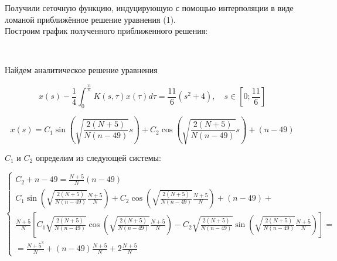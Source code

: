 \documentclass[14pt,a4paper]{scrartcl}
\begin{document}
Получили сеточную функцию, индуцирующую с помощью интерполяции в виде ломаной приближённое решение уравнения (1).\\
Построим график полученного приближенного решения:
\begin{figure}[H]
	\begin{minipage}[h]{1\linewidth}
		  \\
	\end{minipage}
\end{figure}
Найдем аналитическое решение уравнения

\begin{equation*}
x(s)-\frac{1}{4} \int_{0}^{\frac{11}{6}} K(s, \tau) x(\tau) d \tau=\frac{11}{6}\left(s^{2}+4\right), \quad s \in[0 ; \frac{11}{6}]
\end{equation*}

\begin{equation*}
	x(s)=C_{1} \sin (\sqrt{\frac{2(N+5)}{N(n-49)}} s)+C_{2} \cos (\sqrt{\frac{2(N+5)}{N(n-49)}} s)+(n-49)
\end{equation*}

$C_1$ и $C_2$ определим из следующей системы:

\begin{equation*}
	\left\{\begin{array}{l}{C_{2}+n-49=\frac{N+5}{N}(n-49)} \\ {C_{1} \sin \left(\sqrt{\frac{2(N+5)}{N(n-49)}} \frac{N+5}{N}\right)+C_{2} \cos \left(\sqrt{\frac{2(N+5)}{N(n-49)}} \frac{N+5}{N}\right)+(n-49)+} \\ {\frac{N+5}{N}\left[C_{1} \sqrt{\frac{2(N+5)}{N(n-49)}} \cos \left(\sqrt{\frac{2(N+5)}{N(n-49)}} \frac{N+5}{N}\right)-C_{2} \sqrt{\frac{2(N+5)}{N(n-49)}} \sin \left(\sqrt{\frac{2(N+5)}{N(n-49)}} \frac{N+5}{N}\right)\right]=} \\ {=\frac{N+5^{3}}{N}+(n-49) \frac{N+5}{N}+2 \frac{N+5}{N}}\end{array}\right.
\end{equation*}
\end{document}
